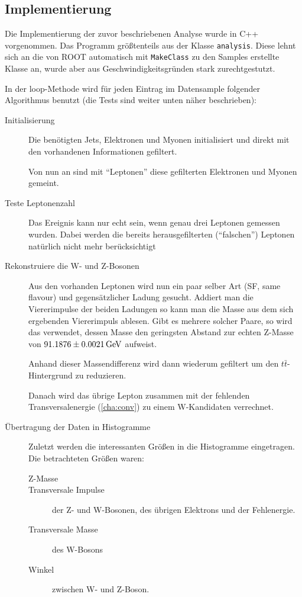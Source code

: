 \subsection{Implementierung}
Die Implementierung der zuvor beschriebenen Analyse wurde in C++ vorgenommen.
Das Programm größtenteils aus der Klasse \lstinline!analysis!. Diese lehnt sich
an die von ROOT automatisch mit \lstinline!MakeClass! zu den Samples erstellte
Klasse an, wurde aber aus Geschwindigkeitsgründen stark zurechtgestutzt.

In der loop-Methode wird für jeden Eintrag im Datensample folgender Algorithmus
benutzt (die Tests sind weiter unten näher beschrieben):
\begin{description}
  \item[Initialisierung] Die benötigten Jets, Elektronen und Myonen
    initialisiert und direkt mit den vorhandenen Informationen gefiltert.

    Von nun an sind mit "`Leptonen"' diese gefilterten Elektronen und Myonen
    gemeint.

  \item[Teste Leptonenzahl] Das Ereignis kann nur echt sein, wenn genau drei
    Leptonen gemessen wurden. Dabei werden die bereits herausgefilterten
    ("`falschen"') Leptonen natürlich nicht mehr berücksichtigt
    
  \item[Rekonstruiere die W- und Z-Bosonen] Aus den vorhanden Leptonen wird nun
    ein paar selber Art (SF, same flavour) und gegensätzlicher Ladung gesucht.
    Addiert man die Viererimpulse der beiden Ladungen so kann man die Masse aus
    dem sich ergebenden Viererimpuls ablesen. Gibt es mehrere solcher Paare, so
    wird das verwendet, dessen Masse den geringsten Abstand zur echten Z-Masse
    von $\unit[91.1876 \pm 0.0021]{GeV}$\cite{pdg-booklet} aufweist.

    Anhand dieser Massendifferenz wird dann wiederum gefiltert um den
    $t\bar{t}$-Hintergrund zu reduzieren.

    Danach wird das übrige Lepton zusammen mit der fehlenden
    Transversalenergie (\ref{cha:conv}) zu einem W-Kandidaten verrechnet.

  \item[Übertragung der Daten in Histogramme] Zuletzt werden die interessanten
    Größen in die Histogramme eingetragen. Die betrachteten Größen waren:
    \begin{description}
      \item[Z-Masse]
      \item[Transversale Impulse] der Z- und W-Bosonen, des übrigen Elektrons
        und der Fehlenergie.
      \item[Transversale Masse] des W-Bosons
      \item[Winkel] zwischen W- und Z-Boson.
    \end{description}
\end{description}


